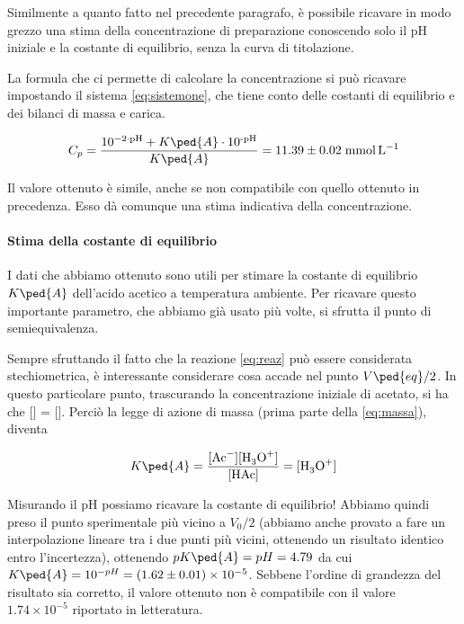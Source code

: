 Similmente a quanto fatto nel precedente paragrafo, è possibile ricavare in modo grezzo una stima
della concentrazione di preparazione conoscendo solo il pH iniziale e la costante di equilibrio, senza
la curva di titolazione.

La formula che ci permette di calcolare la concentrazione si può ricavare impostando il sistema \eqref{eq:sistemone},
che tiene conto delle costanti di equilibrio e dei bilanci di massa e carica.

\begin{equation}
    C_p = \frac{10^{-2 \cdot \text{pH}} + K\ped{A} \cdot 10^\text{-pH}}{K\ped{A}} = 11.39 \pm 0.02 \; \si{\milli\mol\per\litre}
\end{equation}

Il valore ottenuto è simile, anche se non compatibile con quello ottenuto in precedenza.
Esso dà comunque una stima indicativa della concentrazione.

\paragraph{Stima della costante di equilibrio}

I dati che abbiamo ottenuto sono utili per stimare la costante di equilibrio $K\ped{A}$ dell'acido
acetico a temperatura ambiente. Per ricavare questo importante parametro, che abbiamo già usato più
volte, si sfrutta il punto di semiequivalenza.

Sempre sfruttando il fatto che la reazione \eqref{eq:reaz} può essere considerata stechiometrica,
è interessante considerare cosa accade nel punto $V\ped{eq}/2$. In questo particolare punto,
trascurando la concentrazione iniziale di acetato, si ha che [] = [].
Perciò la legge di azione di massa (prima parte della \eqref{eq:massa}), diventa 

\begin{equation}
    K\ped{A} = \frac{[\ce{Ac-}][\ce{H3O+}]}{[\ce{HAc}]} = [\ce{H3O+}]
\end{equation}

Misurando il pH possiamo ricavare la costante di equilibrio! Abbiamo quindi preso il punto sperimentale
più vicino a $V_0/2$ (abbiamo anche provato a fare un interpolazione lineare tra i due punti più
vicini, ottenendo un risultato identico entro l'incertezza), ottenendo $pK\ped{A} = pH = 4.79$ da cui
$K\ped{A} = 10^{-pH} = (1.62 \pm 0.01) \times 10^{-5}$. Sebbene l'ordine di grandezza del risultato sia corretto, il valore ottenuto non è compatibile con il valore $1.74 \times 10^{-5}$ riportato in letteratura.

